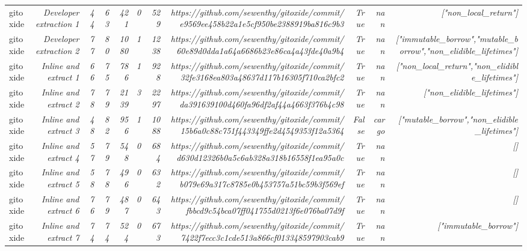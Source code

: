 \begin{landscape}
\begin{table}[]
{\begin{tabular}{lrrrrrrrrrr}
gitoxide & \textit{Developer extraction 1} & \textit{44} & \textit{63} & \textit{421} & \textit{0} & \textit{529} & \textit{https://github.com/sewenthy/gitoxide/commit/e9569ee458b22a1e5cf950be2388919ba816c9b3} & \textit{True} & \textit{nan} & \textit{["non\_local\_return"]} \\
gitoxide & \textit{Developer extraction 2} & \textit{77} & \textit{80} & \textit{1080} & \textit{1} & \textit{1238} & \textit{https://github.com/sewenthy/gitoxide/commit/60e89d0dda1a64a6686b23e86ca4a43fde40a9b4} & \textit{True} & \textit{nan} & \textit{["immutable\_borrow","mutable\_borrow","non\_elidible\_lifetimes"]} \\
gitoxide & \textit{Inline and extract 1} & \textit{66} & \textit{75} & \textit{786} & \textit{1} & \textit{928} & \textit{https://github.com/sewenthy/gitoxide/commit/32fe3168ea803a48637d117b16305f710ca2bfc2} & \textit{True} & \textit{nan} & \textit{["non\_local\_return","non\_elidible\_lifetimes"]} \\
gitoxide & \textit{Inline and extract 2} & \textit{78} & \textit{79} & \textit{2139} & \textit{3} & \textit{2297} & \textit{https://github.com/sewenthy/gitoxide/commit/da391639100d460fa96df2af44a4663f376b4c98} & \textit{True} & \textit{nan} & \textit{["non\_elidible\_lifetimes"]} \\
gitoxide & \textit{Inline and extract 3} & \textit{48} & \textit{82} & \textit{956} & \textit{1} & \textit{1088} & \textit{https://github.com/sewenthy/gitoxide/commit/15b6a0c88c751f443349ffe2d4549353f12a5364} & \textit{False} & \textit{cargo} & \textit{["mutable\_borrow","non\_elidible\_lifetimes"]} \\
gitoxide & \textit{Inline and extract 4} & \textit{57} & \textit{79} & \textit{548} & \textit{0} & \textit{684} & \textit{https://github.com/sewenthy/gitoxide/commit/d630d12326b0a5c6ab328a318b16558f1ea95a0c} & \textit{True} & \textit{nan} & \textit{[]} \\
gitoxide & \textit{Inline and extract 5} & \textit{58} & \textit{78} & \textit{496} & \textit{0} & \textit{632} & \textit{https://github.com/sewenthy/gitoxide/commit/b079e69a317c8785e0b453757a51bc59b3f569ef} & \textit{True} & \textit{nan} & \textit{[]} \\
gitoxide & \textit{Inline and extract 6} & \textit{76} & \textit{79} & \textit{487} & \textit{0} & \textit{643} & \textit{https://github.com/sewenthy/gitoxide/commit/fbbcd9c54bca07ff041755d0213f6e076ba07d9f} & \textit{True} & \textit{nan} & \textit{[]} \\
gitoxide & \textit{Inline and extract 7} & \textit{74} & \textit{74} & \textit{524} & \textit{0} & \textit{673} & \textit{https://github.com/sewenthy/gitoxide/commit/7422f7ecc3c1cde513a866cf013348597903cab9} & \textit{True} & \textit{nan} & \textit{["immutable\_borrow"]} \\

\end{tabular}}
\end{table}
\end{landscape}
